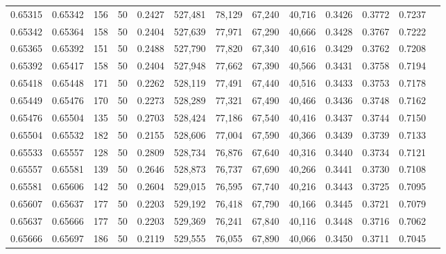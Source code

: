 \begin{tabular}{rrrrrrrrrrrrr}
0.65315 & 0.65342 &   156 &  50 &                                     0.2427 & 527,481 &  78,129 &  67,240 &  40,716 & 0.3426 & 0.3772 & 0.7237 \\
0.65342 & 0.65364 &   158 &  50 &                                     0.2404 & 527,639 &  77,971 &  67,290 &  40,666 & 0.3428 & 0.3767 & 0.7222 \\
0.65365 & 0.65392 &   151 &  50 &                                     0.2488 & 527,790 &  77,820 &  67,340 &  40,616 & 0.3429 & 0.3762 & 0.7208 \\
0.65392 & 0.65417 &   158 &  50 &                                     0.2404 & 527,948 &  77,662 &  67,390 &  40,566 & 0.3431 & 0.3758 & 0.7194 \\
0.65418 & 0.65448 &   171 &  50 &                                     0.2262 & 528,119 &  77,491 &  67,440 &  40,516 & 0.3433 & 0.3753 & 0.7178 \\
0.65449 & 0.65476 &   170 &  50 &                                     0.2273 & 528,289 &  77,321 &  67,490 &  40,466 & 0.3436 & 0.3748 & 0.7162 \\
0.65476 & 0.65504 &   135 &  50 &                                     0.2703 & 528,424 &  77,186 &  67,540 &  40,416 & 0.3437 & 0.3744 & 0.7150 \\
0.65504 & 0.65532 &   182 &  50 &                                     0.2155 & 528,606 &  77,004 &  67,590 &  40,366 & 0.3439 & 0.3739 & 0.7133 \\
0.65533 & 0.65557 &   128 &  50 &                                     0.2809 & 528,734 &  76,876 &  67,640 &  40,316 & 0.3440 & 0.3734 & 0.7121 \\
0.65557 & 0.65581 &   139 &  50 &                                     0.2646 & 528,873 &  76,737 &  67,690 &  40,266 & 0.3441 & 0.3730 & 0.7108 \\
0.65581 & 0.65606 &   142 &  50 &                                     0.2604 & 529,015 &  76,595 &  67,740 &  40,216 & 0.3443 & 0.3725 & 0.7095 \\
0.65607 & 0.65637 &   177 &  50 &                                     0.2203 & 529,192 &  76,418 &  67,790 &  40,166 & 0.3445 & 0.3721 & 0.7079 \\
0.65637 & 0.65666 &   177 &  50 &                                     0.2203 & 529,369 &  76,241 &  67,840 &  40,116 & 0.3448 & 0.3716 & 0.7062 \\
0.65666 & 0.65697 &   186 &  50 &                                     0.2119 & 529,555 &  76,055 &  67,890 &  40,066 & 0.3450 & 0.3711 & 0.7045 \\

\end{tabular}
